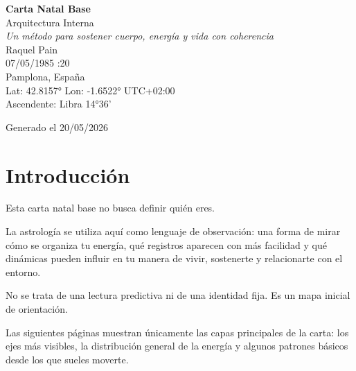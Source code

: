\documentclass[11pt,a4paper]{article}
\begin{document}

\begin{titlepage}

\centering

\vspace*{1.5cm}

{\Huge\bfseries\color{azulai} Carta Natal Base}\\[0.5cm]

{\large\color{grisai} Arquitectura Interna}\\[0.4cm]

{\small\itshape\color{grisai}
Un método para sostener cuerpo, energía y vida con coherencia
}\\[2cm]

{\huge\color{doradoai} Raquel Pain}\\[1.5cm]

{\Large 07/05/1985 :20}\\[0.3cm]

{\Large Pamplona, España}\\[0.3cm]

{\normalsize
Lat: 42.8157° \quad
Lon: -1.6522° \quad
UTC+02:00
}\\[0.5cm]

{\normalsize
Ascendente: Libra 14°36'
}\\[2.5cm]

\vfill

{\small Generado el 20/05/2026}

\end{titlepage}



\section*{Introducción}

Esta carta natal base no busca definir quién eres.

La astrología se utiliza aquí como lenguaje de observación:
una forma de mirar cómo se organiza tu energía,
qué registros aparecen con más facilidad
y qué dinámicas pueden influir en tu manera de vivir, sostenerte y relacionarte con el entorno.

No se trata de una lectura predictiva ni de una identidad fija.
Es un mapa inicial de orientación.

Las siguientes páginas muestran únicamente las capas principales de la carta:
los ejes más visibles,
la distribución general de la energía
y algunos patrones básicos desde los que sueles moverte.
\end{document}
